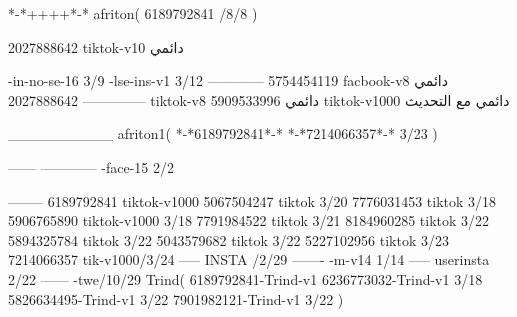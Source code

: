*-*++++*-*
afriton(
6189792841 /8/8
)

2027888642 tiktok-v10
دائمي

-in-no-se-16 3/9
-lse-ins-v1 3/12
------------
5754454119 facbook-v8
دائمي
--------------
2027888642 tiktok-v8
دائمي
5909533996 tiktok-v1000
دائمي مع التحديث

__________
afriton1(
*-*6189792841*-*
*-*7214066357*-* 3/23
)


------
------------
-face-15 2/2

--------
6189792841 tiktok-v1000
5067504247 tiktok 3/20
7776031453 tiktok 3/18
5906765890 tiktok-v1000 3/18
7791984522 tiktok 3/21
8184960285 tiktok 3/22
5894325784 tiktok 3/22
5043579682 tiktok 3/22
5227102956 tiktok 3/23
7214066357 tik-v1000/3/24
-----
 INSTA /2/29
-------
-m-v14 1/14
-----
userinsta 2/22
------
-twe/10/29
Trind(
6189792841-Trind-v1 
6236773032-Trind-v1 3/18
5826634495-Trind-v1 3/22
7901982121-Trind-v1 3/22
)
